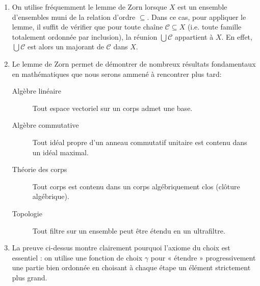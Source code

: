 \begin{remarque}
	\begin{enumerate}
		\item On utilise fréquemment le lemme de Zorn lorsque $X$ est un ensemble d'ensembles muni de la relation d'ordre $\subseteq$. Dans ce cas, pour appliquer le lemme, il suffit de vérifier que pour toute chaîne $\mathcal{C} \subseteq X$ (i.e. toute famille totalement ordonnée par inclusion), la réunion $\bigcup \mathcal{C}$ appartient à $X$. En effet, $\bigcup \mathcal{C}$ est alors un majorant de $\mathcal{C}$ dans $X$.

		\item Le lemme de Zorn permet de démontrer de nombreux résultats fondamentaux en mathématiques que nous serons ammené à rencontrer plus tard:
		      \begin{description}
			      \item[Algèbre linéaire] Tout espace vectoriel sur un corps admet une base.
			      \item[Algèbre commutative] Tout idéal propre d'un anneau commutatif unitaire est contenu dans un idéal maximal.
			      \item[Théorie des corps] Tout corps est contenu dans un corps algébriquement clos (clôture algébrique).
			      \item[Topologie] Tout filtre sur un ensemble peut être étendu en un ultrafiltre.
		      \end{description}

		\item La preuve ci-dessus montre clairement pourquoi l'axiome du choix est essentiel : on utilise une fonction de choix $\gamma$ pour « étendre » progressivement une partie bien ordonnée en choisant à chaque étape un élément strictement plus grand.
	\end{enumerate}
\end{remarque}


